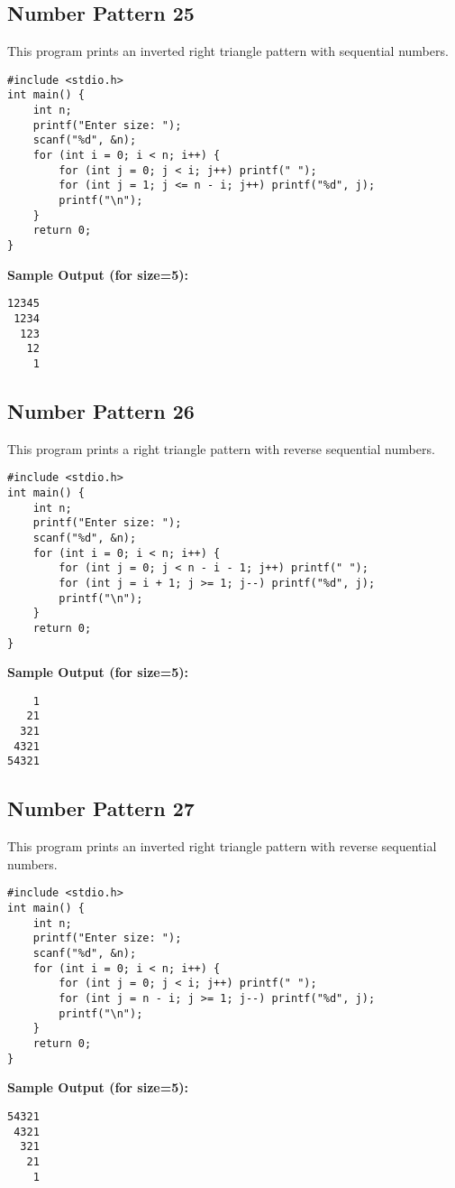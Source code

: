 \documentclass[a4paper,12pt]{article}
\begin{document}
\subsection{Number Pattern 25}
This program prints an inverted right triangle pattern with sequential numbers.
\begin{lstlisting}[caption={Number Pattern 25}]
#include <stdio.h>
int main() {
    int n;
    printf("Enter size: ");
    scanf("%d", &n);
    for (int i = 0; i < n; i++) {
        for (int j = 0; j < i; j++) printf(" ");
        for (int j = 1; j <= n - i; j++) printf("%d", j);
        printf("\n");
    }
    return 0;
}
\end{lstlisting}
\textbf{Sample Output (for size=5):}
\begin{verbatim}
12345
 1234
  123
   12
    1
\end{verbatim}
\clearpage

\subsection{Number Pattern 26}
This program prints a right triangle pattern with reverse sequential numbers.
\begin{lstlisting}[caption={Number Pattern 26}]
#include <stdio.h>
int main() {
    int n;
    printf("Enter size: ");
    scanf("%d", &n);
    for (int i = 0; i < n; i++) {
        for (int j = 0; j < n - i - 1; j++) printf(" ");
        for (int j = i + 1; j >= 1; j--) printf("%d", j);
        printf("\n");
    }
    return 0;
}
\end{lstlisting}
\textbf{Sample Output (for size=5):}
\begin{verbatim}
    1
   21
  321
 4321
54321
\end{verbatim}
\clearpage

\subsection{Number Pattern 27}
This program prints an inverted right triangle pattern with reverse sequential numbers.
\begin{lstlisting}[caption={Number Pattern 27}]
#include <stdio.h>
int main() {
    int n;
    printf("Enter size: ");
    scanf("%d", &n);
    for (int i = 0; i < n; i++) {
        for (int j = 0; j < i; j++) printf(" ");
        for (int j = n - i; j >= 1; j--) printf("%d", j);
        printf("\n");
    }
    return 0;
}
\end{lstlisting}
\textbf{Sample Output (for size=5):}
\begin{verbatim}
54321
 4321
  321
   21
    1
\end{verbatim}
\clearpage
\end{document}
